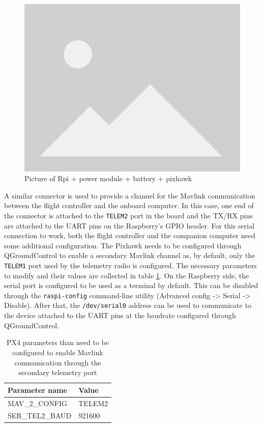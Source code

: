 
\begin{figure}
  \centering
  \includegraphics[width=.6\textwidth, keepaspectratio]{img/placeholder.png}
  \caption{Picture of Rpi + power module + battery + pixhawk}\label{fig:power-supply}
\end{figure}



A similar connector is used to provide a channel for the Mavlink communication between the flight controller and the onboard computer.
In this case, one end of the connector is attached to the \texttt{TELEM2} port in the board and the TX/RX pins are attached to the UART pins on the Raspberry's GPIO header.
For this serial connection to work, both the flight controller and the companion computer need some additional configuration.
The Pixhawk needs to be configured through QGroundControl to enable a secondary Mavlink channel as, by default, only the \texttt{TELEM1} port used by the telemetry radio is configured.
The necessary parameters to modify and their values are collected in table \ref{tab:telem2-params}.
On the Raspberry side, the serial port is configured to be used as a terminal by default.
This can be disabled through the \texttt{raspi-config} command-line utility (Advanced config -> Serial -> Disable).
After that, the \texttt{/dev/serial0} address can be used to communicate to the device attached to the UART pins at the baudrate configured through QGroundControl.

\begin{table}[h!]
 \begin{center}
  \begin{tabular}{l|l}
    Parameter name & Value \\ \hline
    MAV\_2\_CONFIG & TELEM2 \\
    SER\_TEL2\_BAUD & 921600 \\
  \end{tabular}
  \caption{PX4 parameters than need to be configured to enable Mavlink communication through the secondary telemetry port}
  \label{tab:telem2-params}
 \end{center}
\end{table}


